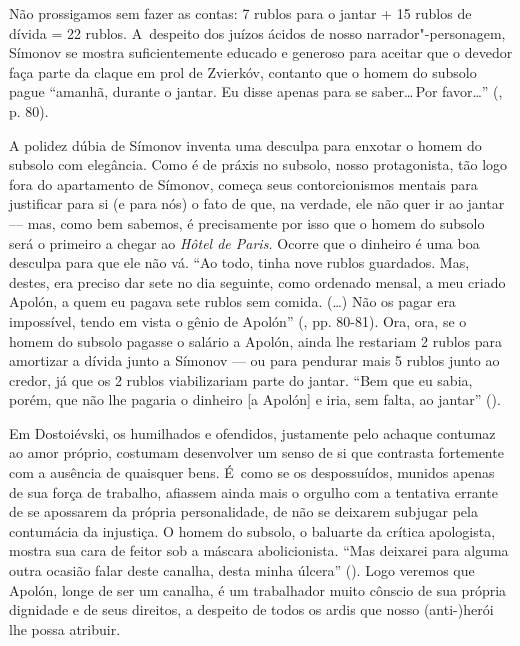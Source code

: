 Não prossigamos sem fazer as contas: 7 rublos para o jantar + 15 rublos
de dívida = 22 rublos. A~despeito dos juízos ácidos de nosso
narrador"-personagem, Símonov se mostra suficientemente educado e
generoso para aceitar que o devedor faça parte da claque em prol de
Zvierkóv, contanto que o homem do subsolo pague ``amanhã, durante o
jantar. Eu disse apenas para se saber\ldots \,Por favor\ldots'' (, p. 80).

A polidez dúbia de Símonov inventa uma desculpa para enxotar o homem do
subsolo com elegância. Como é de práxis no subsolo, nosso protagonista,
tão logo fora do apartamento de Símonov, começa seus contorcionismos
mentais para justificar para si (e para nós) o fato de que, na verdade,
ele não quer ir ao jantar --- mas, como bem sabemos, é precisamente por
isso que o homem do subsolo será o primeiro a chegar ao \emph{Hôtel de
Paris.} Ocorre que o dinheiro é uma boa desculpa para que ele não vá.
``Ao todo, tinha nove rublos guardados. Mas, destes, era preciso dar
sete no dia seguinte, como ordenado mensal, a meu criado Apolón, a quem
eu pagava sete rublos sem comida. (\ldots) Não os pagar era impossível,
tendo em vista o gênio de Apolón'' (, pp. 80-81). Ora, ora, se o
homem do subsolo pagasse o salário a Apolón, ainda lhe restariam 2
rublos para amortizar a dívida junto a Símonov --- ou para pendurar mais
5 rublos junto ao credor, já que os 2 rublos viabilizariam parte do
jantar. ``Bem que eu sabia, porém, que não lhe pagaria o dinheiro {[}a
Apolón{]} e iria, sem falta, ao jantar'' ().

Em Dostoiévski, os humilhados e ofendidos, justamente pelo achaque
contumaz ao amor próprio, costumam desenvolver um senso de si que
contrasta fortemente com a ausência de quaisquer bens. É~como se os
despossuídos, munidos apenas de sua força de trabalho, afiassem ainda
mais o orgulho com a tentativa errante de se apossarem da própria
personalidade, de não se deixarem subjugar pela contumácia da injustiça.
O homem do subsolo, o baluarte da crítica apologista, mostra sua cara de
feitor sob a máscara abolicionista. ``Mas deixarei para alguma outra
ocasião falar deste canalha, desta minha úlcera'' (). Logo veremos
que Apolón, longe de ser um canalha, é um trabalhador muito cônscio de
sua própria dignidade e de seus direitos, a despeito de todos os ardis
que nosso \mbox{(anti-)herói} lhe possa atribuir.

